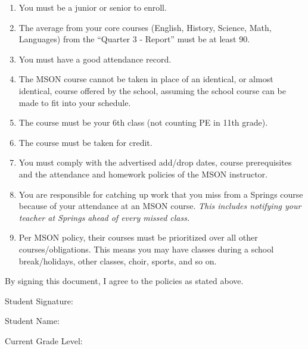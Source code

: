 \begin{enumerate}\itemsep=0mm
\item You must be a junior or senior to enroll.
\item The average from your core courses (English, History, Science, Math, Languages) from the “Quarter 3 - Report” must be at least 90.
\item You must have a good attendance record. 
\item The MSON course cannot be taken in place of an identical, or almost identical, course offered by the school, assuming the school course can be made to fit into your schedule. 
\item The course must be your 6th class (not counting PE in 11th grade). 
\item The course must be taken for credit. 
\item You must comply with the advertised add/drop dates, course prerequisites and the attendance and homework policies of the MSON instructor. 
\item You are responsible for catching up work that you miss from a Springs course because of your attendance at an MSON course.  \emph{This includes notifying your teacher at Springs ahead of every missed class.}  
\item Per MSON policy, their courses must be prioritized over all other courses/obligations.  This means you may have classes during a school break/holidays, other classes, choir, sports, and so on.  
\end{enumerate}



By signing this document, I agree to the policies as stated above.

\vspace{.75cm}

\hfill Student Signature: \underline{\hspace{3in}}

\vspace{.5cm}

\noindent\hrulefill

\vspace{.5cm}

\hfill Student Name: \underline{\hspace{3in}}

\vspace{1cm}

\hfill Current Grade Level:  \underline{\hspace{3in}}


